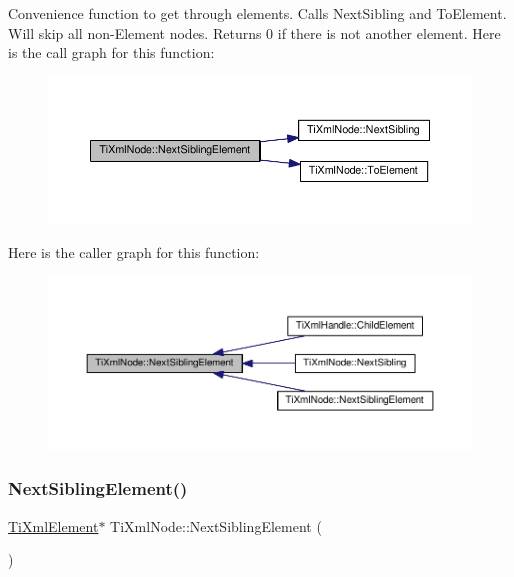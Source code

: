 Convenience function to get through elements. Calls Next\+Sibling and To\+Element. Will skip all non-\/\+Element nodes. Returns 0 if there is not another element. Here is the call graph for this function\+:
\nopagebreak
\begin{figure}[H]
\begin{center}
\leavevmode
\includegraphics[width=350pt]{class_ti_xml_node_ac6105781c913a42aa7f3f17bd1964f7c_cgraph}
\end{center}
\end{figure}
Here is the caller graph for this function\+:
\nopagebreak
\begin{figure}[H]
\begin{center}
\leavevmode
\includegraphics[width=350pt]{class_ti_xml_node_ac6105781c913a42aa7f3f17bd1964f7c_icgraph}
\end{center}
\end{figure}
\mbox{\label{class_ti_xml_node_a1b211cb5034655a04358e0e2f6fc5010}} 
\subsubsection{\texorpdfstring{Next\+Sibling\+Element()}{NextSiblingElement()}\hspace{0.1cm}{\footnotesize\ttfamily [2/4]}}
{\footnotesize\ttfamily \hyperlink{class_ti_xml_element}{Ti\+Xml\+Element}$\ast$ Ti\+Xml\+Node\+::\+Next\+Sibling\+Element (\begin{DoxyParamCaption}{ }\end{DoxyParamCaption})\hspace{0.3cm}{\ttfamily [inline]}}


